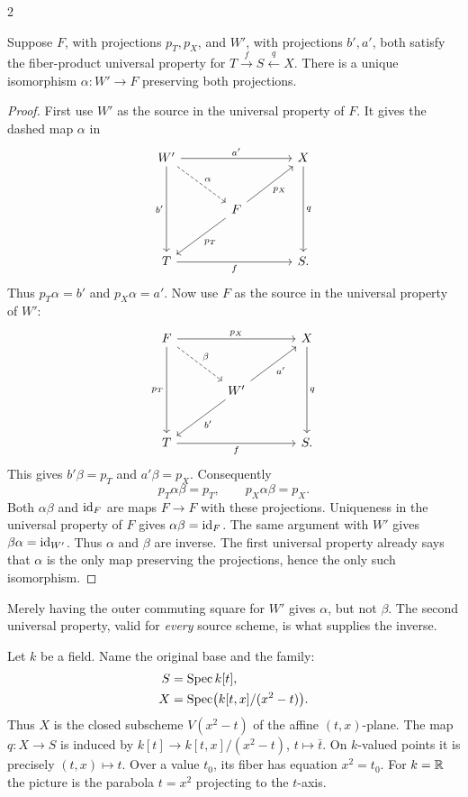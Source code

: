 \documentclass[12pt]{memoir}
\begin{document}
\begin{multicols}{2}
\begin{Prop}\label{prop:fiberunique}
Suppose $F$, with projections $p_T,p_X$, and $W'$, with projections
$b',a'$, both satisfy the fiber-product universal property for
$T\xrightarrow{f}S\xleftarrow{q}X$. There is a unique isomorphism
$\alpha:W'\to F$ preserving both projections.
\end{Prop}
\begin{proof}
First use $W'$ as the source in the universal property of $F$.
It gives the dashed map $\alpha$ in
\[
\begin{tikzcd}[column sep=large,row sep=large]
W' \arrow[rr,"a'"] \arrow[dr,dashed,"\alpha"]
 \arrow[dd,"b'"'] &&X \arrow[dd,"q"]\\
&F \arrow[ur,"p_X"'] \arrow[dl,"p_T"] &\\
T \arrow[rr,"f"'] &&S.
\end{tikzcd}
\]
Thus $p_T\alpha=b'$ and $p_X\alpha=a'$.
Now use $F$ as the source in the universal property of $W'$:
\[
\begin{tikzcd}[column sep=large,row sep=large]
F \arrow[rr,"p_X"] \arrow[dr,dashed,"\beta"]
 \arrow[dd,"p_T"'] &&X \arrow[dd,"q"]\\
&W' \arrow[ur,"a'"'] \arrow[dl,"b'"] &\\
T \arrow[rr,"f"'] &&S.
\end{tikzcd}
\]
This gives $b'\beta=p_T$ and $a'\beta=p_X$.
Consequently
\[
 p_T\alpha\beta=p_T,\qquad p_X\alpha\beta=p_X.
\]
Both $\alpha\beta$ and $\operatorname{id}_F$ are maps $F\to F$ with these
projections. Uniqueness in the universal property of $F$ gives
$\alpha\beta=\operatorname{id}_F$. The same argument with $W'$ gives
$\beta\alpha=\operatorname{id}_{W'}$. Thus $\alpha$ and $\beta$ are inverse.
The first universal property already says that $\alpha$ is the only
map preserving the projections, hence the only such isomorphism.
\end{proof}

\begin{Rmk}
Merely having the outer commuting square for $W'$ gives $\alpha$,
but not $\beta$. The second universal property, valid for \emph{every}
source scheme, is what supplies the inverse.
\end{Rmk}

\begin{Ex}\label{ex:parabola}
Let $k$ be a field. Name the original base and the family:
\[
\begin{aligned}
 S&=\operatorname{Spec} k[t],\\
 X&=\operatorname{Spec}\bigl(k[t,x]/(x^2-t)\bigr).
\end{aligned}
\]
Thus $X$ is the closed subscheme $V(x^2-t)$ of the affine $(t,x)$-plane.
The map $q:X\to S$ is induced by
$k[t]\to k[t,x]/(x^2-t)$, $t\mapsto\bar t$. On $k$-valued points
it is precisely $(t,x)\mapsto t$. Over a value $t_0$, its fiber has
equation $x^2=t_0$. For $k=\mathbb{R}$ the picture is the parabola $t=x^2$
projecting to the $t$-axis.


\end{Ex}
\end{multicols}
\end{document}
